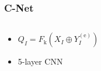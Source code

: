 \documentclass[12pt, aspectratio = 169, xcolor = x11names]{beamer}
\begin{document}
\begin{frame}
  \frametitle{C-Net}
  \begin{columns}
    \begin{column}{0.5\textwidth}
      \begin{itemize}
        \item$Q_I = F_\mathrm{k}(X_I \oplus Y_I^{(\mathrm{e})})$
        \item 5-layer CNN
      \end{itemize}
    \end{column}
  \end{columns}
\end{frame}
\end{document}
